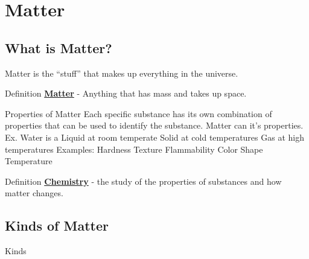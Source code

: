 \documentclass[../../main.tex]{subfiles}
\begin{document}
\chapter{Matter}

\section{What is Matter?}
\begin{outline}[enumerate]
    \1 \colorbox{dracPink}{Matter is the “stuff” that makes up everything in the universe.}

    \begin{displayquote}
        \begin{boxBox}{Definition}
            {\large\textbf{\underline{Matter}}} - Anything that has mass and takes up space.
        \end{boxBox}
    \end{displayquote}

    \1 Properties of Matter
    \2 Each specific substance has its own combination of properties that can be used to identify the substance.
    \2 \colorbox{dracPink}{Matter can  it's properties.}
    \3 Ex. Water is a
    \4 Liquid at room temperate
    \4 Solid at cold temperatures
    \4 Gas at high temperatures
    \2 Examples:
    \3 Hardness
    \3 Texture
    \3 Flammability
    \3 Color
    \3 Shape
    \3 Temperature

    \begin{displayquote}
        \begin{boxBox}{Definition}
            {\large\textbf{\underline{Chemistry}}} - the study of the properties of substances and how matter changes.
        \end{boxBox}
    \end{displayquote}

    \section{Kinds of Matter}

     Kinds

\end{outline}
\end{document}
